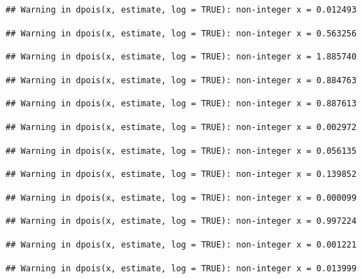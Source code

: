 \documentclass[]{article}
\begin{document}
\begin{verbatim}
## Warning in dpois(x, estimate, log = TRUE): non-integer x = 0.012493
\end{verbatim}

\begin{verbatim}
## Warning in dpois(x, estimate, log = TRUE): non-integer x = 0.563256
\end{verbatim}

\begin{verbatim}
## Warning in dpois(x, estimate, log = TRUE): non-integer x = 1.885740
\end{verbatim}

\begin{verbatim}
## Warning in dpois(x, estimate, log = TRUE): non-integer x = 0.884763
\end{verbatim}

\begin{verbatim}
## Warning in dpois(x, estimate, log = TRUE): non-integer x = 0.887613
\end{verbatim}

\begin{verbatim}
## Warning in dpois(x, estimate, log = TRUE): non-integer x = 0.002972
\end{verbatim}

\begin{verbatim}
## Warning in dpois(x, estimate, log = TRUE): non-integer x = 0.056135
\end{verbatim}

\begin{verbatim}
## Warning in dpois(x, estimate, log = TRUE): non-integer x = 0.139852
\end{verbatim}

\begin{verbatim}
## Warning in dpois(x, estimate, log = TRUE): non-integer x = 0.000099
\end{verbatim}

\begin{verbatim}
## Warning in dpois(x, estimate, log = TRUE): non-integer x = 0.997224
\end{verbatim}

\begin{verbatim}
## Warning in dpois(x, estimate, log = TRUE): non-integer x = 0.001221
\end{verbatim}

\begin{verbatim}
## Warning in dpois(x, estimate, log = TRUE): non-integer x = 0.013999
\end{verbatim}
\end{document}
